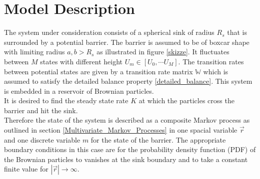 \section{Model Description}
\label{Model_Description}
The system under consideration consists of a spherical sink of radius $R_s$ that is surrounded by a potential barrier. The barrier is assumed to be of boxcar shape with limiting radius $a,b>R_s$ as illustrated in figure \ref{skizze}. It fluctuates between $M$ states with different height $U_m \in [U_0, \cdots U_M]$. The transition rates between potential states are given by a transition rate matrix $\mathbb{W}$ which is assumed to satisfy the detailed balance property \eqref{detailed_balance}. This system is embedded in a reservoir of Brownian particles. \\
It is desired to find the steady state rate $K$ at which the particles cross the barrier and hit the sink.\\
Therefore the state of the system is described as a composite Markov process as outlined in section \ref{Multivariate_Markov_Processes} in one spacial variable $\vec{r}$ and one discrete variable $m$ for the state of the barrier.
The appropriate boundary conditions in this case are for the probability density function (PDF) of the Brownian particles to vanishes at the sink boundary and to take a constant finite value for $|\vec{r}| \rightarrow \infty$. \\
